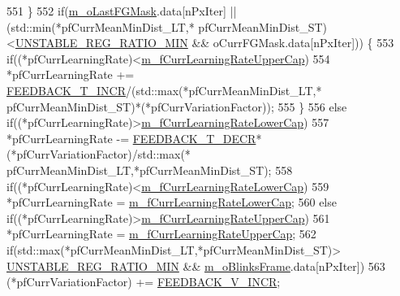 \begin{DoxyCode}
551             \}
552             \textcolor{keywordflow}{if}(\mbox{\hyperlink{class_background_subtractor_l_b_s_p_adb6dc0af596c5592c91f9d8faa5c8a4b}{m\_oLastFGMask}}.data[nPxIter] || (std::min(*pfCurrMeanMinDist\_LT,*
      pfCurrMeanMinDist\_ST)<\mbox{\hyperlink{_background_subtractor_su_b_s_e_n_s_e_8cpp_acaad1bde74ca3c5a5c43c0e8deea2313}{UNSTABLE\_REG\_RATIO\_MIN}} && oCurrFGMask.data[nPxIter])) \{
553                 \textcolor{keywordflow}{if}((*pfCurrLearningRate)<\mbox{\hyperlink{class_background_subtractor_su_b_s_e_n_s_e_a44ba1a1ed365c5829baa517ce9f27508}{m\_fCurrLearningRateUpperCap}})
554                     *pfCurrLearningRate += \mbox{\hyperlink{_background_subtractor_su_b_s_e_n_s_e_8cpp_afa487dca8c1f4ae73e03567566465382}{FEEDBACK\_T\_INCR}}/(std::max(*pfCurrMeanMinDist\_LT,*
      pfCurrMeanMinDist\_ST)*(*pfCurrVariationFactor));
555             \}
556             \textcolor{keywordflow}{else} \textcolor{keywordflow}{if}((*pfCurrLearningRate)>\mbox{\hyperlink{class_background_subtractor_su_b_s_e_n_s_e_a57fdd29e43afc163233e55f9a7cd9f37}{m\_fCurrLearningRateLowerCap}})
557                 *pfCurrLearningRate -= \mbox{\hyperlink{_background_subtractor_su_b_s_e_n_s_e_8cpp_aeb1e65c4ebe34d91c849054de1951361}{FEEDBACK\_T\_DECR}}*(*pfCurrVariationFactor)/std::max(*
      pfCurrMeanMinDist\_LT,*pfCurrMeanMinDist\_ST);
558             \textcolor{keywordflow}{if}((*pfCurrLearningRate)<\mbox{\hyperlink{class_background_subtractor_su_b_s_e_n_s_e_a57fdd29e43afc163233e55f9a7cd9f37}{m\_fCurrLearningRateLowerCap}})
559                 *pfCurrLearningRate = \mbox{\hyperlink{class_background_subtractor_su_b_s_e_n_s_e_a57fdd29e43afc163233e55f9a7cd9f37}{m\_fCurrLearningRateLowerCap}};
560             \textcolor{keywordflow}{else} \textcolor{keywordflow}{if}((*pfCurrLearningRate)>\mbox{\hyperlink{class_background_subtractor_su_b_s_e_n_s_e_a44ba1a1ed365c5829baa517ce9f27508}{m\_fCurrLearningRateUpperCap}})
561                 *pfCurrLearningRate = \mbox{\hyperlink{class_background_subtractor_su_b_s_e_n_s_e_a44ba1a1ed365c5829baa517ce9f27508}{m\_fCurrLearningRateUpperCap}};
562             \textcolor{keywordflow}{if}(std::max(*pfCurrMeanMinDist\_LT,*pfCurrMeanMinDist\_ST)>
      \mbox{\hyperlink{_background_subtractor_su_b_s_e_n_s_e_8cpp_acaad1bde74ca3c5a5c43c0e8deea2313}{UNSTABLE\_REG\_RATIO\_MIN}} && \mbox{\hyperlink{class_background_subtractor_su_b_s_e_n_s_e_a943b50c63d233c0948d82b64390f1aa1}{m\_oBlinksFrame}}.data[nPxIter])
563                 (*pfCurrVariationFactor) += \mbox{\hyperlink{_background_subtractor_su_b_s_e_n_s_e_8cpp_a55f10981362bbf2c494e76d1b8002255}{FEEDBACK\_V\_INCR}};

\end{DoxyCode}
